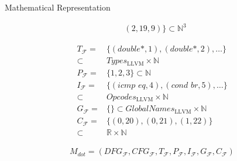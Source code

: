 \begin{blackbox}{Mathematical Representation}
\begin{minipage}{0.329\textwidth}
\begin{graybox}
\begin{align*}
                  &(2,19,9)\}\subset\mathbb N^3
            \end{align*}
        \end{graybox}
    \end{minipage}
    \begin{minipage}{0.329\textwidth}
        \centering
        \begin{graybox}
            \scriptsize
            \setlength{\abovedisplayskip}{0pt}
            \setlength{\belowdisplayskip}{0pt}
            \vspace{-0.5em}
            \begin{align*}
                T_\mathcal F={}&\{(\textit{double*},1),(\textit{double*},2),\dots\}\\[-0.5em]
                      \subset{}&Types_\text{LLVM}\times\mathbb N\\[-0.25em]
                P_\mathcal F={}&\{1,2,3\}\subset\mathbb N\\[-0.25em]
                I_\mathcal F={}&\{(\textit{icmp eq},4),(\textit{cond br},5),\dots\}\\[-0.5em]
                      \subset{}&Opcodes_\text{LLVM}\times\mathbb N\\[-0.25em]
                G_\mathcal F={}&\{\}\subset GlobalNames_\text{LLVM}\times\mathbb N\\[-0.25em]
                C_\mathcal F={}&\{(0,20),(0,21),(1,22)\}\\[-0.5em]
                      \subset{}&\mathbb R\times\mathbb N
            \end{align*}

            \vspace{0.45em}
        \end{graybox}
    \end{minipage}

    \begin{minipage}{0.55\textwidth}
        \begin{graybox}
            \setlength{\abovedisplayskip}{0pt}
            \setlength{\belowdisplayskip}{0pt}
            \vspace{-0.5em}
            \begin{align*}
                M_{dot}=(DFG_\mathcal{F},
                 CFG_\mathcal{F},
                 T_\mathcal{F},
                 P_\mathcal{F},
                 I_\mathcal{F},
                 G_\mathcal{F},
                 C_\mathcal{F})
            \end{align*}
        \end{graybox}
    \end{minipage}
\end{blackbox}